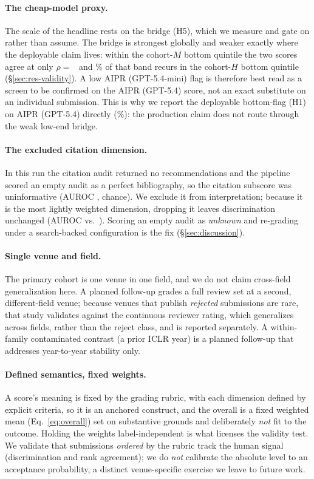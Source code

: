 \paragraph{The cheap-model proxy.}
The scale of the headline rests on the bridge (H5), which we measure and gate on
rather than assume. The bridge is strongest globally and weaker exactly where the
deployable claim lives: within the cohort-$M$ bottom quintile the two scores agree at
only $\rho =$~\bridgeLowRhoFull{} and \bridgeOverlap\% of that band recurs in the cohort-$H$
bottom quintile (\S\ref{sec:res-validity}). A low AIPR (GPT-5.4-mini) flag is therefore
best read as a screen to be confirmed on the AIPR (GPT-5.4) score, not an exact
substitute on an individual submission. This is why we report the deployable bottom-flag
(H1) on AIPR (GPT-5.4) directly (\bottomRejectRateFrontier\%): the production claim does
not route through the weak low-end bridge.

\paragraph{The excluded citation dimension.}
In this run the citation audit returned no recommendations and the pipeline scored an
empty audit as a perfect bibliography, so the citation subscore was uninformative (AUROC
\citationAUROC, chance). We exclude it from interpretation; because it is the most lightly
weighted dimension, dropping it leaves discrimination unchanged (AUROC
\aurocDropCitationFull{} vs.\ \aurocFull). Scoring an empty audit as \emph{unknown} and
re-grading under a search-backed configuration is the fix (\S\ref{sec:discussion}).

\paragraph{Single venue and field.}
The primary cohort is one venue in one field, and we do not claim cross-field
generalization here. A planned follow-up grades a full review set at a second,
different-field venue; because venues that publish \emph{rejected} submissions are
rare, that study validates against the continuous reviewer rating, which generalizes
across fields, rather than the reject class, and is reported separately. A
within-family contaminated contrast (a prior ICLR year) is a planned follow-up that
addresses year-to-year stability only.

\paragraph{Defined semantics, fixed weights.}
A score's meaning is fixed by the grading rubric, with each dimension defined by
explicit criteria, so it is an anchored construct, and the overall is a fixed weighted
mean (Eq.~\ref{eq:overall}) set on substantive grounds and deliberately \emph{not} fit
to the outcome. Holding the weights label-independent is what licenses the validity
test. We validate that submissions \emph{ordered} by the rubric track the human signal
(discrimination and rank agreement); we do \emph{not} calibrate the absolute level to
an acceptance probability, a distinct venue-specific exercise we leave to future work.

